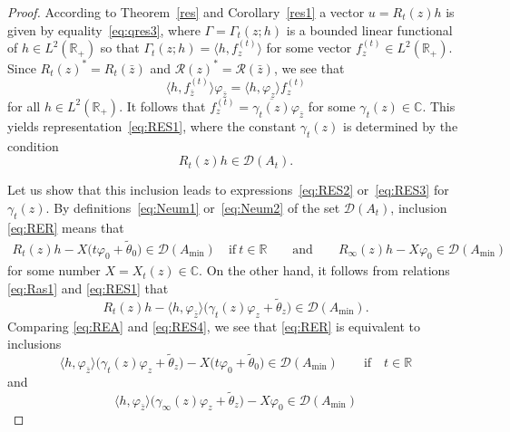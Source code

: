 \documentclass[pdftex]{sigma}%
\numberwithin{equation}{section}
\begin{document}
\begin{proof} According to Theorem~\ref{res} and Corollary~\ref{res1} a vector $u=R_{t} (z) h$ is given by equali\-ty~\eqref{eq:qres3}, where
 $ \Gamma= \Gamma_{t}(z;h)$ is a bounded linear functional of $h\in L^2 ({\mathbb R}_{+})$ so that
 $\Gamma_{t}(z;h)= \big\langle h, f_{z}^{(t)}\big\rangle$
 for some vector $ f_{z}^{(t)} \in L^2 ({\mathbb R}_{+})$.
 Since $R_{t} (z)^*=R_{t} (\bar{z})$ and ${\mathcal R} (z)^*={\mathcal R} (\bar{z})$, we see that
 \[
 \big\langle h, f_{\bar{z}}^{(t)} \big\rangle \varphi_{\bar{z}} =\langle h, \varphi_{z}\rangle f_{z}^{(t)}
 \]
 for all $h\in L^2 ({\mathbb R}_{+})$. It follows that $f_{z}^{(t)} = \overline{\gamma_{t} (z)} \varphi_{\bar{z}}$ for some $\gamma_{t} (z) \in{\mathbb C}$. This yields representation~\eqref{eq:RES1}, where the constant $\gamma_{t} (z) $ is determined by the condition
 \begin{equation}
 R_{t} (z) h\in {\mathcal D} (A_{t}).
 \label{eq:RER}\end{equation}

 Let us show that this inclusion leads to expressions~\eqref{eq:RES2} or~\eqref{eq:RES3} for $\gamma_{t}(z)$.
 By definitions~\eqref{eq:Neum1} or~\eqref{eq:Neum2} of the set ${\mathcal D} (A_{t})$, inclusion \eqref{eq:RER}
 means that
 \begin{gather}
R_{t} (z) h - X \big( t \varphi_{0} + \tilde{\theta}_{0}\big)\in {\mathcal D} (A_{\min}) \quad \mbox{if} \ t\in {\mathbb R}
 \qquad \mbox{and} \qquad R_\infty (z) h - X \varphi_{0} \in {\mathcal D} (A_{\min})
 \label{eq:REA}\end{gather}
 for some number $X=X_{t}(z)\in {\mathbb C}$. On the other hand, it follows from
 relations \eqref{eq:Ras1} and \eqref{eq:RES1} that
 \begin{equation}
R_{t} (z) h -\langle h, \varphi_{\bar{z}}\rangle \big( \gamma_{t} (z) \varphi_{z} + \tilde{\theta}_{z}\big)\in{\mathcal D} (A_{\min}).
 \label{eq:RES4}\end{equation}
 Comparing \eqref{eq:REA} and \eqref{eq:RES4}, we see that \eqref{eq:RER} is equivalent to inclusions
 \begin{equation}
\langle h, \varphi_{\bar{z}}\rangle \big(\gamma_{t} (z) \varphi_{z} + \tilde{\theta}_{z} \big) - X \big( t \varphi_{0} + \tilde{\theta}_{0}\big)\in {\mathcal D} (A_{\min})\qquad \mbox{if} \quad t\in {\mathbb R}
 \label{eq:REA1}\end{equation}
 and
 \begin{equation}
\langle h, \varphi_{\bar{z}}\rangle \big(\gamma_\infty (z) \varphi_{z}+ \tilde{\theta}_{z} \big) - X \varphi_{0} \in {\mathcal D} (A_{\min})
 \label{eq:REA2}\end{equation}


\end{proof}
\end{document}
